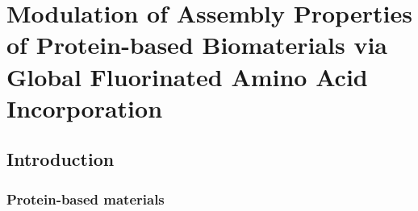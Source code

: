 \chapter{Modulation of Assembly Properties of Protein-based Biomaterials via
Global Fluorinated Amino Acid Incorporation}
\label{chap:pff}
\begin{refsection}

\section{Introduction}

\subsection{Protein-based materials}



\end{refsection}
